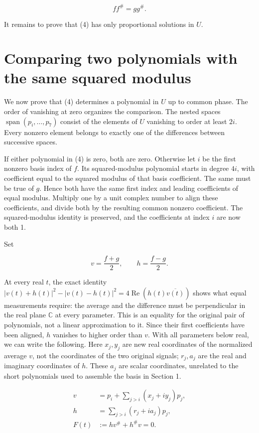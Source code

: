 \[
ff^\#=gg^\#. \tag{4}
\]

It remains to prove that (4) has only proportional solutions in \(U\).

\section{Comparing two polynomials with the same squared
modulus}\label{comparing-two-polynomials-with-the-same-squared-modulus}

We now prove that (4) determines a polynomial in \(U\) up to common
phase. The order of vanishing at zero organizes the comparison. The
nested spaces \(\operatorname{span}(p_i,\ldots,p_7)\) consist of the
elements of \(U\) vanishing to order at least \(2i\). Every nonzero
element belongs to exactly one of the differences between successive
spaces.

If either polynomial in (4) is zero, both are zero. Otherwise let \(i\)
be the first nonzero basis index of \(f\). Its squared-modulus
polynomial starts in degree \(4i\), with coefficient equal to the
squared modulus of that basis coefficient. The same must be true of
\(g\). Hence both have the same first index and leading coefficients of
equal modulus. Multiply one by a unit complex number to align these
coefficients, and divide both by the resulting common nonzero
coefficient. The squared-modulus identity is preserved, and the
coefficients at index \(i\) are now both 1.

Set

\[
v=\frac{f+g}{2},\qquad h=\frac{f-g}{2}.
\]

At every real \(t\), the exact identity
\(|v(t)+h(t)|^2-|v(t)-h(t)|^2=4\operatorname{Re}(h(t)\overline{v(t)})\)
shows what equal measurements require: the average and the difference
must be perpendicular in the real plane \(\mathbb C\) at every
parameter. This is an equality for the original pair of polynomials, not
a linear approximation to it. Since their first coefficients have been
aligned, \(h\) vanishes to higher order than \(v\). With all parameters
below real, we can write the following. Here \(x_j,y_j\) are new real
coordinates of the normalized average \(v\), not the coordinates of the
two original signals; \(r_j,a_j\) are the real and imaginary coordinates
of \(h\). These \(a_j\) are scalar coordinates, unrelated to the short
polynomials used to assemble the basis in Section 1.

\[
\begin{aligned}
v&=p_i+\sum_{j>i}(x_j+iy_j)p_j,\\
h&=\sum_{j>i}(r_j+ia_j)p_j,\\
F(t)&:=hv^\#+h^\#v=0.
\end{aligned}\tag{5}
\]


